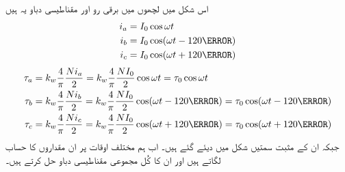 اس شکل میں لچھوں میں برقی رو اور مقناطیسی دباو یہ ہیں
\begin{gather}
\begin{aligned}\label{مساوات_گھومتے_مشین_تین_دور_برقی_رو}
i_a&=I_0 \cos \omega t\\
i_b&=I_0 \cos (\omega t-120\degree)\\
i_c&=I_0 \cos (\omega t+120\degree)
\end{aligned}
\end{gather}
%
\begin{gather}
\begin{aligned}\label{مساوات_گھومتے_مشین_تین_دور_دباو}
\tau_a&=k_w \frac{4}{\pi}\frac{N i_a}{2}=k_w \frac{4}{\pi}\frac{N I_0}{2} \cos \omega t=\tau_0 \cos \omega t\\
\tau_b&=k_w \frac{4}{\pi}\frac{N i_b}{2}=k_w \frac{4}{\pi}\frac{N I_0}{2} \cos (\omega t-120\degree)=\tau_0 \cos (\omega t-120\degree)\\
\tau_c&=k_w \frac{4}{\pi}\frac{N i_c}{2}=k_w \frac{4}{\pi}\frac{N I_0}{2} \cos (\omega t+120\degree)=\tau_0 \cos (\omega t+120\degree)
\end{aligned}
\end{gather}
جبکہ ان کے مثبت سمتیں شکل میں دیئے گئے ہیں۔ اب ہم مختلف اوقات پر ان مقداروں کا حساب لگاتے ہیں اور ان کا کُل مجموعی مقناطیسی دباو حل کرتے ہیں۔

